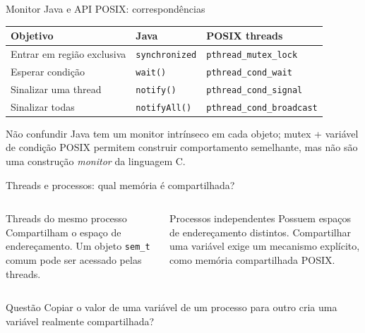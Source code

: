 \documentclass[aspectratio=169,11pt]{beamer}
\begin{document}
\begin{frame}{Monitor Java e API POSIX: correspondências}
\footnotesize
\begin{tabular}{p{3.5cm}p{3.4cm}p{3.2cm}}
\toprule
\textbf{Objetivo} & \textbf{Java} & \textbf{POSIX threads}\\
\midrule
Entrar em região exclusiva & \texttt{synchronized} & \texttt{pthread\_mutex\_lock}\\
Esperar condição & \texttt{wait()} & \texttt{pthread\_cond\_wait}\\
Sinalizar uma thread & \texttt{notify()} & \texttt{pthread\_cond\_signal}\\
Sinalizar todas & \texttt{notifyAll()} & \texttt{pthread\_cond\_broadcast}\\
\bottomrule
\end{tabular}
\vspace{.25cm}
\begin{alertblock}{Não confundir}
Java tem um monitor intrínseco em cada objeto; mutex + variável de condição POSIX permitem construir comportamento semelhante, mas não são uma construção \emph{monitor} da linguagem C.
\end{alertblock}
\end{frame}

\begin{frame}{Threads e processos: qual memória é compartilhada?}
\small
\begin{columns}[T]
\begin{block}{Threads do mesmo processo}
Compartilham o espaço de endereçamento. Um objeto \texttt{sem\_t} comum pode ser acessado pelas threads.
\end{block}
\begin{block}{Processos independentes}
Possuem espaços de endereçamento distintos. Compartilhar uma variável exige um mecanismo explícito, como memória compartilhada POSIX.
\end{block}
\end{columns}
\vspace{.3cm}
\begin{alertblock}{Questão}
Copiar o valor de uma variável de um processo para outro cria uma variável realmente compartilhada?
\end{alertblock}
\end{frame}
\end{document}
